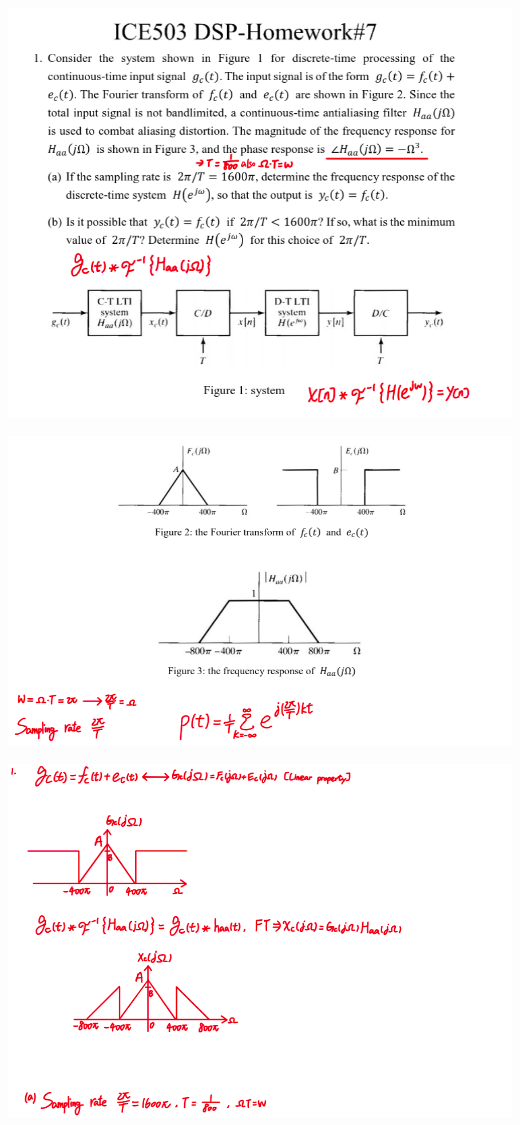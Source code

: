 \documentclass[a4paper]{article}
\begin{document}
	
	\begin{center}
		\includegraphics[width=1\linewidth]{screenshot063}
	\end{center}
	
	\begin{center}
		\includegraphics[width=1\linewidth]{screenshot064}
	\end{center}
	
	\begin{center}
		\includegraphics[width=1\linewidth]{screenshot065}
	\end{center}
	
\end{document}
